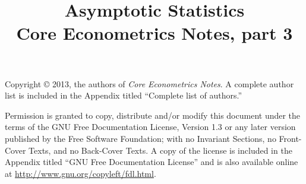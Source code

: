 \documentclass[nohyper]{tufte-handout}
\title[Asymptotic statistics]%
{Asymptotic Statistics \\
  Core Econometrics Notes, part 3}
\begin{document}
\maketitle

\bigskip\noindent%
Copyright © 2013, the authors of \textit{Core Econometrics Notes}.  A
complete author list is included in the Appendix titled ``Complete
list of authors.''

Permission is granted to copy, distribute and/or modify this document
under the terms of the GNU Free Documentation License, Version 1.3 or
any later version published by the Free Software Foundation; with no
Invariant Sections, no Front-Cover Texts, and no Back-Cover Texts.  A
copy of the license is included in the Appendix titled ``GNU Free
Documentation License'' and is also available online at
\url{http://www.gnu.org/copyleft/fdl.html}.

\tableofcontents









\end{document}
